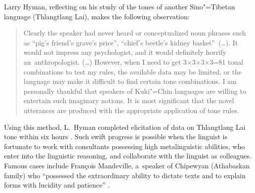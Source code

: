 Larry Hyman, reflecting on his study of the tones of another {Sino"=Tibetan} language (Thlangtlang
Lai), makes the following observation:
\begin{quotation}
  Clearly the speaker had never heard or conceptualized noun phrases such as “pig’s friend’s
  grave’s price”, “chief’s beetle’s kidney basket”~({\dots}). It would not impress any psychologist, and
  it would definitely horrify an~anthropologist. ({\dots}) However, when I need to get 3×3×3×3=81 tonal combinations to test my rules, the available data may be limited, or the
  language may make it difficult to find certain tone combinations. I am personally thankful that
  speakers of Kuki"=Chin languages are willing to entertain such imaginary notions. It is most
  significant that the novel utterances are produced with the appropriate application of tone
  rules.~\citep[34]{hyman2007a}
\end{quotation}

{\noindent}Using this method, L.\ Hyman completed elicitation of data on Thlangtlang Lai tone within six hours
\citep[9]{hyman2007a}. Such swift progress is possible when the linguist is fortunate to work with
consultants possessing high metalinguistic abilities, who enter into the linguistic reasoning, and
collaborate with the linguist as colleagues. Famous cases include François Mandeville, a~speaker
of Chipewyan (Athabaskan family) who “possessed the extraordinary ability to dictate texts and to explain forms with
lucidity and patience” \citep[132]{li1964}. 

